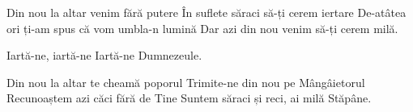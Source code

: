 
\beginverse
Din nou la altar venim fără putere
În suflete săraci să-ți cerem iertare
De-atâtea ori ți-am spus că vom umbla-n lumină
Dar azi din nou venim să-ți cerem milă.
\endverse

\beginchorus
Iartă-ne, iartă-ne
Iartă-ne Dumnezeule.
\endchorus

\beginverse
Din nou la altar te cheamă poporul
Trimite-ne din nou pe Mângâietorul
Recunoaștem azi căci fără de Tine
Suntem săraci și reci, ai milă Stăpâne.
\endverse

\endsong
